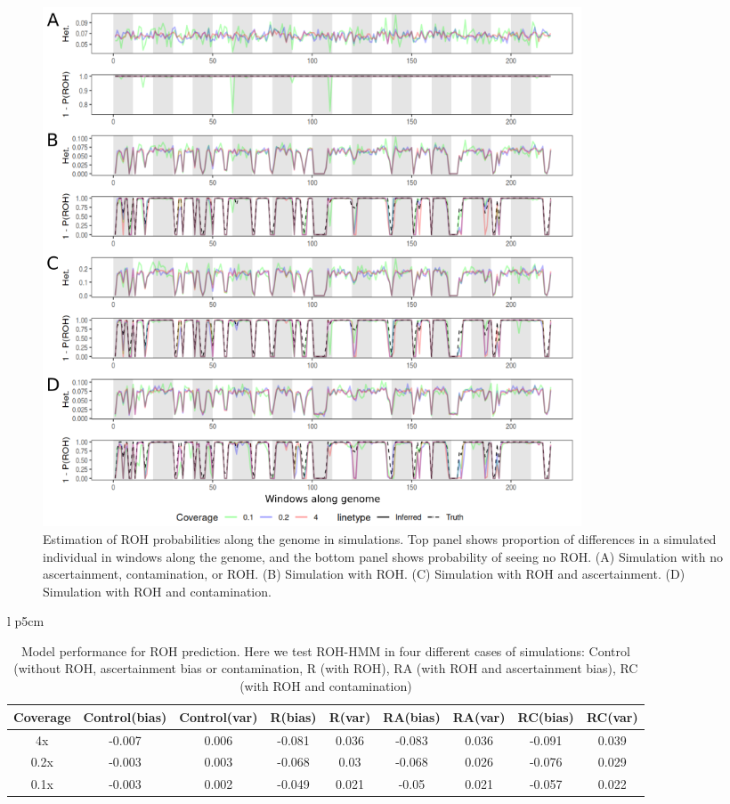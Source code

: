 \documentclass[12pt, letterpaper]{article}
\begin{document}
\begin{figure}[h!]
    \includegraphics[width=16cm]{plots/inkscape_finalImg/ROHplot_final.png}
    \centering
    \caption{Estimation of ROH probabilities along the genome in simulations. Top panel shows proportion of differences in a simulated individual in windows along the genome, and the bottom panel shows probability of seeing no ROH. (A) Simulation with no ascertainment, contamination, or ROH. (B) Simulation with ROH. (C) Simulation with ROH and ascertainment. (D) Simulation with ROH and contamination.}
    \label{fig2:ROH}
\end{figure}

\begin{table}[h!]{ l p{5cm}}
\caption{\label{tab:Table 2}Model performance for ROH prediction. Here we test ROH-HMM in four different cases of simulations: Control (without ROH, ascertainment bias or contamination, R (with ROH), RA (with ROH and ascertainment bias), RC (with ROH and contamination)}
\begin{tabular}{|c|c|c|c|c|c|c|c|c|}
    \hline
    Coverage & Control(bias) & Control(var) & R(bias) & R(var) & RA(bias) & RA(var) & RC(bias) & RC(var)\\
    \hline
    4x & -0.007 & 0.006 & -0.081 & 0.036 & -0.083 & 0.036 & -0.091 & 0.039\\
    \hline
    0.2x & -0.003 & 0.003 & -0.068 & 0.03 & -0.068 & 0.026 & -0.076 & 0.029\\
    \hline
    0.1x & -0.003 & 0.002 & -0.049 & 0.021 & -0.05 & 0.021 & -0.057 & 0.022\\
    \hline
\end{tabular}
\label{table1}
\end{table}
\end{document}
